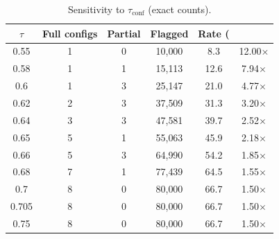 \begin{table}[htbp]
\centering
\small
\caption{Sensitivity to $\tau_{\mathrm{conf}}$ (exact counts).}
\label{tab:tau_sweep}
\begin{tabular}{cccccc}
\toprule
$\tau$ & Full configs & Partial & Flagged & Rate (\\%
\midrule
0.55 & 1 & 0 & 10{,}000 & 8.3 & 12.00$\times$ \\
0.58 & 1 & 1 & 15{,}113 & 12.6 & 7.94$\times$ \\
0.6 & 1 & 3 & 25{,}147 & 21.0 & 4.77$\times$ \\
0.62 & 2 & 3 & 37{,}509 & 31.3 & 3.20$\times$ \\
0.64 & 3 & 3 & 47{,}581 & 39.7 & 2.52$\times$ \\
0.65 & 5 & 1 & 55{,}063 & 45.9 & 2.18$\times$ \\
0.66 & 5 & 3 & 64{,}990 & 54.2 & 1.85$\times$ \\
0.68 & 7 & 1 & 77{,}439 & 64.5 & 1.55$\times$ \\
0.7 & 8 & 0 & 80{,}000 & 66.7 & 1.50$\times$ \\
0.705 & 8 & 0 & 80{,}000 & 66.7 & 1.50$\times$ \\
0.75 & 8 & 0 & 80{,}000 & 66.7 & 1.50$\times$ \\
\bottomrule
\end{tabular}
\end{table}
